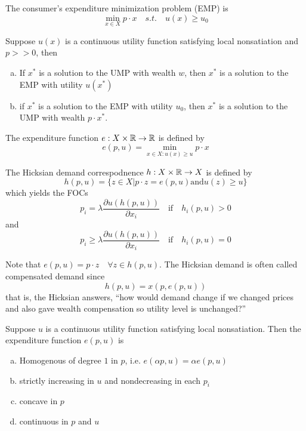 

\begin{definition}[EMP]
  The consumer's expenditure minimization problem (EMP) is
  \[
  \min_{x \in X} p \cdot x \quad s.t. \quad u(x) \geq u_0
  \]
\end{definition}

\begin{prop}
  Suppose $u(x)$ is a continuous utility function satisfying local
  nonsatiation and $p >> 0$, then
  \begin{enumerate}[(a)]
  \item If $x^*$ is a solution to the UMP with wealth $w$, then $x^*$
    is a solution to the EMP with utility $u(x^*)$
  \item if $x^*$ is a solution to the EMP with utility $u_0$, then
    $x^*$ is a solution to the UMP with wealth $p \cdot x^*$.
  \end{enumerate}
\end{prop}

\begin{definition}
  The expenditure function $e : X \times {\mathbb R} \to {\mathbb R}$ is defined by
  \[
  e(p, u) = \min_{x \in X: u(x) \geq u} p \cdot x
  \]
\end{definition}

\begin{definition}
  The Hicksian demand correspodnence $h : X \times {\mathbb R} \to X$ is
  defined by 
  \[
  h(p,u) = \{ z \in X | p \cdot z = e(p,u) \text{and} u(z) \geq u \}
  \]
  which yields the FOCs
  \[
  p_i  = \lambda \frac{\partial u(h(p,u))}{\partial x_i} 
  \quad \text{if} \quad  h_i(p,u) > 0
  \]
  and
  \[
  p_i  \geq \lambda \frac{\partial u(h(p,u))}{\partial x_i} 
  \quad \text{if} \quad h_i(p,u) = 0
  \]
\end{definition}

Note that $e(p,u) = p \cdot z \quad \forall z \in h(p,u)$. The
Hicksian demand is often called compensated demand since
\[
h(p,u) = x(p, e(p,u))
\]
that is, the Hicksian answers, ``how would demand change if we changed
prices and also gave wealth compensation so utility level is
unchanged?''


\begin{prop}
  Suppose $u$ is a continuous utility function satisfying local
  nonsatiation. Then the expenditure function $e(p,u)$ is
  \begin{enumerate}[(a)]
  \item Homogenous of degree $1$ in $p$, i.e. $e(\alpha p, u) = \alpha
    e(p,u)$
  \item strictly increasing in $u$ and nondecreasing in each $p_i$
  \item concave in $p$
  \item continuous in $p$ and $u$
  \end{enumerate}
\end{prop}

